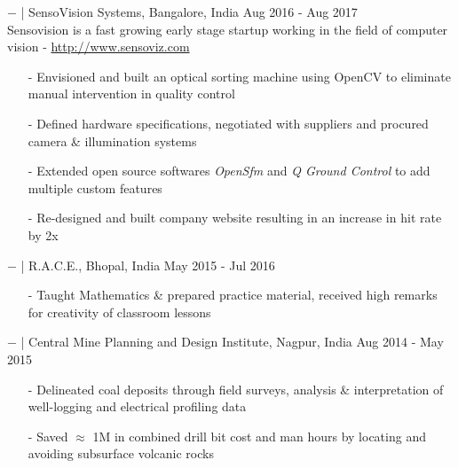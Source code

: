 \documentclass[a4paper, 10pt, oneside]{article}
\newcommand{\bulltetspace}{\vspace{-0.3em}}
\begin{document}
\begin{center}
\vspace{-0.4em}
$-$ \color{headings}{Product Developer} | SensoVision Systems, Bangalore, India \hfill Aug 2016 - Aug 2017\\
\vspace{-0.2em}
\hspace{1.5em }Sensovision is a fast growing early stage startup working in the field of computer vision -  \href{http://sensoviz.com/}{http://www.sensoviz.com}
\color{text1}
\begin{itemize}
\bulltetspace
\item[-]  Envisioned and built an optical sorting machine using \color{headings}OpenCV to eliminate manual intervention in quality control \\
\bulltetspace
\item[-] Defined hardware specifications, negotiated with suppliers and procured camera \& illumination systems \\
\bulltetspace
\item[-] Extended open source softwares \textit{OpenSfm} and \textit{Q Ground Control} to add multiple custom features \\
\bulltetspace
\item[-] Re-designed and built company website resulting in an increase in hit rate by 2x

\end{itemize}
\vspace{-0.4em}
$-$ \color{headings}{Teaching Associate} | R.A.C.E., Bhopal, India \hfill May 2015 - Jul 2016\\
\color{text1}
\begin{itemize}
\bulltetspace
\item[-] Taught Mathematics \& prepared practice material, received high remarks for creativity of classroom lessons\\
\end{itemize}

\vspace{-0.4em}
$-$ \color{headings}{Geophysicist} | Central Mine Planning and Design Institute, Nagpur, India \hfill Aug 2014 - May 2015\\
\color{text1}
\begin{itemize}
\bulltetspace
\item[-] Delineated coal deposits through field surveys, analysis \& interpretation of well-logging and electrical profiling data\\ 
\bulltetspace
\item[-] Saved $\approx$ \faInr 1M in combined drill bit cost and man hours by locating and avoiding subsurface volcanic rocks\\
\bulltetspace
\end{itemize}
\end{center}
\end{document}
